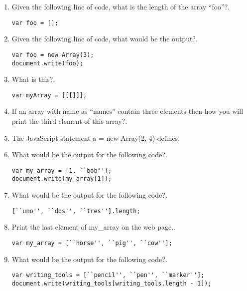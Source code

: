 \documentclass[11pt,a4paper]{article}
\begin{document}
\begin{enumerate}
\item Given the following line of code, what is the length of the array ``foo''?\underline{\hspace{3cm}}.
\begin{lstlisting}
var foo = [];
\end{lstlisting} 
\item Given the following line of code, what would be the output?\underline{\hspace{3cm}}.
\begin{lstlisting}
var foo = new Array(3);
document.write(foo);
\end{lstlisting}
\item What is this?\underline{\hspace{3cm}}.
\begin{lstlisting}
var myArray = [[[]]];
\end{lstlisting}
\item If an array with name as ``names'' contain three elements then how you will print the third element of this array?\underline{\hspace{3cm}}.
\item The JavaScript statement a = new Array(2, 4) defines\underline{\hspace{3cm}}.
\item What would be the output for the following code?\underline{\hspace{3cm}}.
\begin{lstlisting}
var my_array = [1, ``bob''];
document.write(my_array[1]);
\end{lstlisting}
\item What would be the output for the following code?\underline{\hspace{3cm}}.
\begin{lstlisting}
[``uno'', ``dos'', ``tres''].length;
\end{lstlisting}
\item Print the last element of my\_array on the web page.\underline{\hspace{3cm}}.
\begin{lstlisting}
var my_array = [``horse'', ``pig'', ``cow''];
\end{lstlisting}
\item What would be the output for the following code?\underline{\hspace{3cm}}.
\begin{lstlisting}
var writing_tools = [``pencil'', ``pen'', ``marker''];
document.write(writing_tools[writing_tools.length - 1]);

\end{lstlisting}
\end{enumerate}
\end{document}
